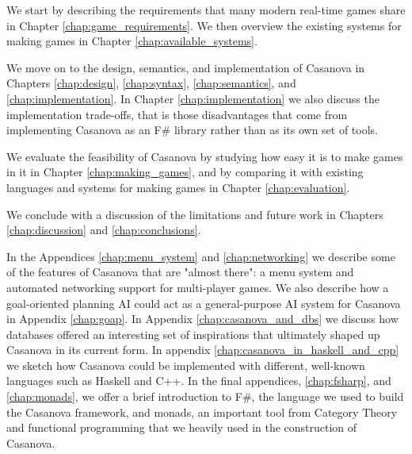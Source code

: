 We start by describing the requirements that many modern real-time games share in Chapter \ref{chap:game_requirements}. We then overview the existing systems for making games in Chapter \ref{chap:available_systems}. 

We move on to the design, semantics, and implementation of Casanova in Chapters \ref{chap:design}, \ref{chap:syntax}, \ref{chap:semantics}, and \ref{chap:implementation}. In Chapter \ref{chap:implementation} we also discuss the implementation trade-offs, that is those disadvantages that come from implementing Casanova as an F\# library rather than as its own set of tools.

We evaluate the feasibility of Casanova by studying how easy it is to make games in it in Chapter \ref{chap:making_games}, and by comparing it with existing languages and systems for making games in Chapter \ref{chap:evaluation}.

We conclude with a discussion of the limitations and future work in Chapters \ref{chap:discussion} and \ref{chap:conclusions}.

In the Appendices \ref{chap:menu_system} and \ref{chap:networking} we describe some of the features of Casanova that are "almost there": a menu system and automated networking support for multi-player games. We also describe how a goal-oriented planning AI could act as a general-purpose AI system for Casanova in Appendix \ref{chap:goap}. In Appendix \ref{chap:casanova_and_dbs} we discuss how databases offered an interesting set of inspirations that ultimately shaped up Casanova in its current form. In appendix \ref{chap:casanova_in_haskell_and_cpp} we sketch how Casanova could be implemented with different, well-known languages such as Haskell and C++. In the final appendices, \ref{chap:fsharp}, and \ref{chap:monads}, we offer a brief introduction to F\#, the language we used to build the Casanova framework, and monads, an important tool from Category Theory and functional programming that we heavily used in the construction of Casanova.
